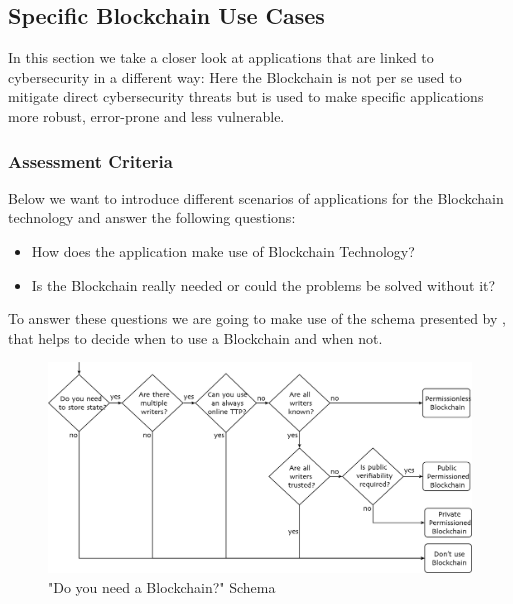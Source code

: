 \subsection{Specific Blockchain Use Cases}
\label{subsec:03_applications}

In this section we take a closer look at applications that are linked to cybersecurity in a different way: Here the Blockchain is not per se used to mitigate direct cybersecurity threats but is used to make specific applications more robust, error-prone and less vulnerable.

\subsubsection{Assessment Criteria}
Below we want to introduce different scenarios of applications for the Blockchain technology and answer the following questions:
\begin{itemize}
    \item How does the application make use of Blockchain Technology?
    \item Is the Blockchain really needed or could the problems be solved without it?
\end{itemize}
To answer these questions we are going to make use of the schema presented by \cite{Wust2017}, that helps to decide when to use a Blockchain and when not.
\begin{figure}[ht!]
    \begin{center}
        \includegraphics[scale=0.6]{Talk7/img/app/BCorNot}
    \end{center}
    \caption{"Do you need a Blockchain?" Schema \cite{Wust2017}}
    \label{fig:Blockchain_or_not}
\end{figure}

